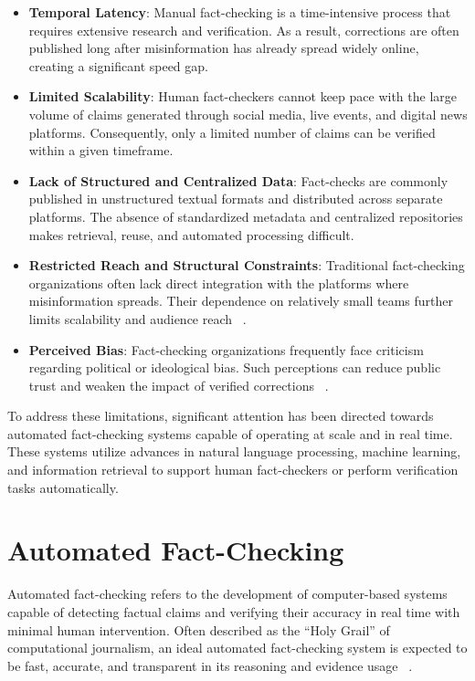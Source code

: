 \begin{itemize} 
    \item \textbf{Temporal Latency}: Manual fact-checking is a time-intensive process that requires extensive research and verification. As a result, corrections are often published long after misinformation has already spread widely online, creating a significant speed gap.
    
    \item \textbf{Limited Scalability}: Human fact-checkers cannot keep pace with the large volume of claims generated through social media, live events, and digital news platforms. Consequently, only a limited number of claims can be verified within a given timeframe.
    
    \item \textbf{Lack of Structured and Centralized Data}: Fact-checks are commonly published in unstructured textual formats and distributed across separate platforms. The absence of standardized metadata and centralized repositories makes retrieval, reuse, and automated processing difficult.
    
    \item \textbf{Restricted Reach and Structural Constraints}: Traditional fact-checking organizations often lack direct integration with the platforms where misinformation spreads. Their dependence on relatively small teams further limits scalability and audience reach ~\cite{QuestToAutomateFactChecking2015Oct}.
    
    \item \textbf{Perceived Bias}: Fact-checking organizations frequently face criticism regarding political or ideological bias. Such perceptions can reduce public trust and weaken the impact of verified corrections ~\cite{FactChecking2025Mar}.
\end{itemize}

To address these limitations, significant attention has been directed towards automated fact-checking systems capable of operating at scale and in real time. These systems utilize advances in natural language processing, machine learning, and information retrieval to support human fact-checkers or perform verification tasks automatically.

\section{Automated Fact-Checking}

Automated fact-checking refers to the development of computer-based systems capable of detecting factual claims and verifying their accuracy in real time with minimal human intervention. Often described as the “Holy Grail” of computational journalism, an ideal automated fact-checking system is expected to be fast, accurate, and transparent in its reasoning and evidence usage ~\cite{QuestToAutomateFactChecking2015Oct}.

